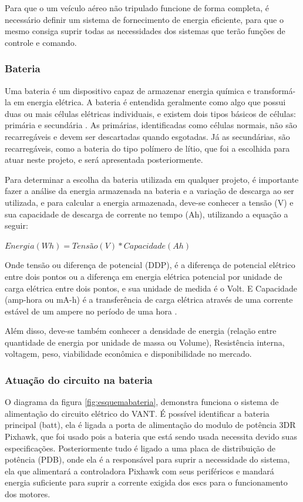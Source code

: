 
Para que o um veículo aéreo não tripulado funcione de forma completa, é necessário definir um sistema de fornecimento de energia eficiente, para que o mesmo consiga suprir todas as necessidades dos sistemas que terão funções de controle e comando.

\subsubsection{Bateria}

Uma bateria é um dispositivo capaz de armazenar energia química e transformá-la em energia elétrica. A bateria é entendida geralmente como algo que possui duas ou mais células elétricas individuais, e existem dois tipos básicos de células: primária e secundária \cite{gibbs}. As primárias, identificadas como células normais, não são recarregáveis e devem ser descartadas quando esgotadas. Já as secundárias, são recarregáveis, como a bateria do tipo polímero de lítio, que foi a escolhida para atuar neste projeto, e será apresentada posteriormente. 

Para determinar a escolha da bateria utilizada em qualquer projeto, é importante fazer a análise  da energia armazenada na bateria e a variação de descarga ao ser utilizada, e para calcular a energia armazenada, deve-se conhecer a tensão (V) e sua capacidade de descarga de corrente no tempo (Ah), utilizando a equação a seguir: \cite{peixoto}

$Energia(Wh)= Tensão(V)*Capacidade(Ah)$

Onde tensão ou diferença de potencial (DDP), é a diferença de potencial elétrico entre dois pontos ou a diferença em energia elétrica potencial por unidade de carga elétrica entre dois pontos, e sua unidade de medida é o Volt. E Capacidade (amp-hora ou mA-h) é a transferência de carga elétrica através de uma corrente estável de um ampere no período de uma hora \cite{gibbs}.

Além disso, deve-se também conhecer a densidade de energia (relação entre quantidade de energia por unidade de massa ou Volume), Resistência interna, voltagem, peso, viabilidade econômica e disponibilidade no mercado.


\subsubsection{Atuação do circuito na bateria}

O diagrama da figura \ref{fig:esquemabateria}, demonstra funciona o sistema de alimentação do circuito elétrico do VANT. É possível identificar 
a bateria principal (batt), ela é ligada a porta de alimentação do modulo de potência 3DR Pixhawk, que foi usado pois a bateria que está sendo
usada necessita devido suas especificações. Posteriormente tudo é ligado a uma placa de distribuição de potência (PDB), onde ela é a
responsável para suprir a necessidade do sistema, ela que alimentará a controladora Pixhawk com seus periféricos e mandará energia
suficiente para suprir a corrente exigida dos escs para o funcionamento dos motores. 


